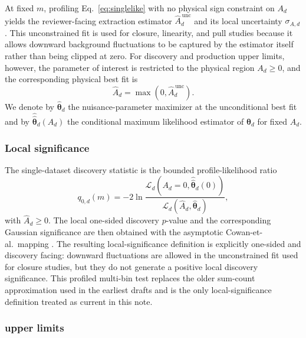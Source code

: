 At fixed $m$, profiling Eq.~\eqref{eq:singlelike} with no physical sign constraint on
$A_d$ yields the reviewer-facing extraction estimator $\hat A_d^{\,\mathrm{unc}}$ and
its local uncertainty $\sigma_{A,d}$. This unconstrained fit is used for closure,
linearity, and pull studies because it allows downward background fluctuations to be
captured by the estimator itself rather than being clipped at zero. For discovery and
production upper limits, however, the parameter of interest is restricted to the
physical region $A_d\ge0$, and the corresponding physical best fit is
\begin{equation}
\hat A_d = \max\!\left(0,\hat A_d^{\,\mathrm{unc}}\right).
\end{equation}
We denote by $\hat{\bm{\theta}}_d$ the nuisance-parameter maximizer at the
unconditional best fit and by $\hat{\hat{\bm{\theta}}}_d(A_d)$ the conditional maximum
likelihood estimator of $\bm{\theta}_d$ for fixed $A_d$.

\subsubsection{Local significance}

The single-dataset discovery statistic is the bounded profile-likelihood ratio
\begin{equation}
q_{0,d}(m) = -2\ln
\frac{\mathcal{L}_d\!\left(A_d=0,\hat{\hat{\bm{\theta}}}_d(0)\right)}
{\mathcal{L}_d\!\left(\hat A_d,\hat{\bm{\theta}}_d\right)},
\label{eq:q0-single}
\end{equation}
with $\hat A_d\ge0$. The local one-sided discovery $p$-value and the corresponding
Gaussian significance are then obtained with the asymptotic Cowan-et-al.\ mapping
\cite{Cowan2011}. The resulting local-significance definition is explicitly
one-sided and discovery facing: downward fluctuations are allowed in the unconstrained
fit used for closure studies, but they do not generate a positive local discovery
significance. This profiled multi-bin test replaces the older sum-count approximation
used in the earliest drafts and is the only local-significance definition treated as
current in this note.

\subsubsection{\texorpdfstring{\CLs}{CLs} upper limits}

